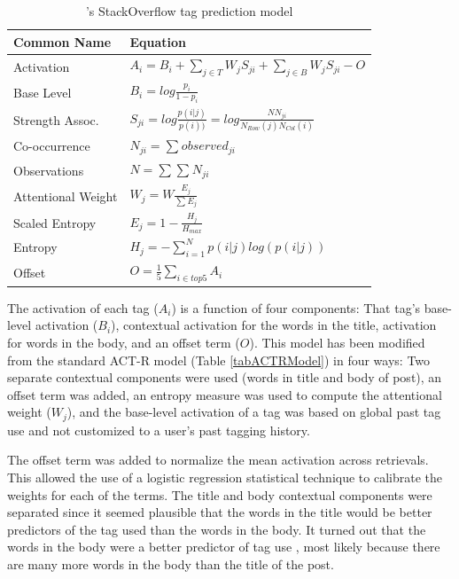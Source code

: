 \documentclass[man,floatsintext,donotrepeattitle]{apa6}
\begin{document}
\begin{table}[!ht]
  \caption{\citeauthor{Stanley2013}'s StackOverflow tag prediction model}
  \label{tabModACTRModel}
  {\tabulinesep=1.2mm
    \begin{tabu}{ll}
      \hline
      Common Name &  Equation \\
      \hline
      Activation & 		$A_{i} = B_{i} + \sum_{j\in T}^{ } W_{j} S_{ji} + \sum_{j\in B}^{ } W_{j} S_{ji} - O$ \\
      Base Level & 		$B_{i} = log \frac{p_{i}}{1-p_{i}}$ \\
      Strength Assoc. &		$S_{ji} = log \frac{p(i|j)}{p(i))} = log \frac{NN_{ji}}{N_{Row}(j)N_{Col}(i)}$ \\
      Co-occurrence &		$N_{ji} = \sum_{}^{}{observed_{ji}}$ \\
      Observations &		$N = \sum_{}^{}{\sum_{}^{}{N_{ji}}}$ \\
      Attentional Weight& 	$W_{j} = W \frac{E_{j}} {\sum_{}^{} {E_{j}}} $ \\
      Scaled Entropy & 		$E_{j} = 1-\frac{H_{j}}{H_{max}}$ \\
      Entropy & 		$H_{j} = -\sum_{i=1}^{N}p(i|j)log\left (  p(i|j) \right )$ \\
      Offset & 			$O = \frac{1}{5}\sum_{i\in top 5}^{ } A_{i}$ \\
      \hline
    \end{tabu}
  }
\end{table}

The activation of each tag ($A_{i}$) is a function of four components:
That tag's base-level activation ($B_{i}$), contextual activation for the words in the title, activation for words in the body, and an offset term ($O$).
This model has been modified from the standard ACT-R model (Table \ref{tabACTRModel}) in four ways:
Two separate contextual components were used (words in title and body of post), an offset term was added, an entropy measure was used to compute the attentional weight ($W_{j}$),
and the base-level activation of a tag was based on global past tag use and not customized to a user's past tagging history.

The offset term was added to normalize the mean activation across retrievals.
This allowed the use of a logistic regression statistical technique to calibrate the weights for each of the terms.
The title and body contextual components were separated since it seemed plausible that the words in the title would be better predictors of the tag used than the words in the body.
It turned out that the words in the body were a better predictor of tag use \parencite{Stanley2013}, most likely because there are many more words in the body than the title of the post.
\end{document}
